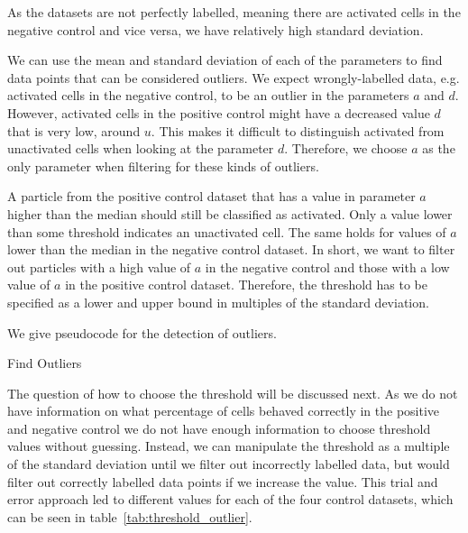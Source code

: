 As the datasets are not perfectly labelled, meaning there are activated cells in the negative control and vice versa, we have relatively high standard deviation.

We can use the mean and standard deviation of each of the parameters to find data points that can be considered outliers. We expect wrongly-labelled data, e.g. activated cells in the negative control, to be an outlier in the parameters $a$ and $d$. However, activated cells in the positive control might have a decreased value $d$ that is very low, around $u$. This makes it difficult to distinguish activated from unactivated cells when looking at the parameter $d$. Therefore, we choose $a$ as the only parameter when filtering for these kinds of outliers.

A particle from the positive control dataset that has a value in parameter $a$ higher than the median should still be classified as activated. Only a value lower than some threshold indicates an unactivated cell. The same holds for values of $a$ lower than the median in the negative control dataset. In short, we want to filter out particles with a high value of $a$ in the negative control and those with a low value of $a$ in the positive control dataset. Therefore, the threshold has to be specified as a lower and upper bound in multiples of the standard deviation.

We give pseudocode for the detection of outliers.

\begin{algorithm}[H] \label{alg:outlier_detection}
	\SetAlgoLined
	\DontPrintSemicolon
	\LinesNumbered
	\caption{Find Outliers}
	
	
	\BlankLine
\end{algorithm}
\vspace{1cm}

The question of how to choose the threshold will be discussed next. As we do not have information on what percentage of cells behaved correctly in the positive and negative control we do not have enough information to choose threshold values without guessing. Instead, we can manipulate the threshold as a multiple of the standard deviation until we filter out incorrectly labelled data, but would filter out correctly labelled data points if we increase the value. This trial and error approach led to different values for each of the four control datasets, which can be seen in table~\ref{tab:threshold_outlier}.

